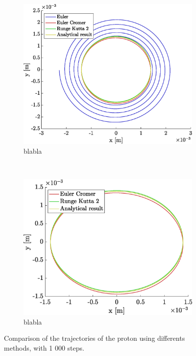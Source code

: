 \documentclass[a4paper,12pt,twoside]{article}
\begin{document}
\begin{figure}[h]
	\centering
	\begin{subfigure}[t]{0.45\textwidth}
	\includegraphics[width=\linewidth]{graphs/ex2_ii_traj_ALL.eps}
		\caption{blabla}
		\label{fig:ex2-ii-traj-all}
	\end{subfigure}
	~
	\begin{subfigure}[t]{0.45\textwidth}
		\includegraphics[width=\linewidth]{graphs/ex2_ii_traj_NoEuler}
		\caption{blabla}
		\label{fig:ex2-ii-traj-NoEuler}
	\end{subfigure}
	
	\caption{Comparison of the trajectories of the proton using differents methods, with 1 000 steps.}
	\label{fig:ex2-ii-traj}
\end{figure}
\end{document}
